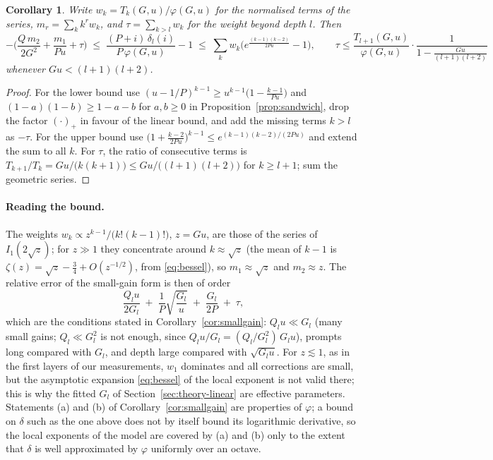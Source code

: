 \documentclass[11pt]{article}
\newtheorem{corollary}{Corollary}
\theoremstyle{definition}
\theoremstyle{remark}
\begin{document}
\begin{corollary}\label{cor:smallgain-quant}
Write $w_k=T_k(G,u)/\varphi(G,u)$ for the normalised terms of the series, $m_r=\sum_kk^rw_k$, and $\tau=\sum_{k>l}w_k$ for the weight beyond depth $l$. Then
\[
-\Big(\frac{Q\,m_2}{2G^2}+\frac{m_1}{Pu}+\tau\Big)\;\le\;\frac{(P+i)\,\delta_l(i)}{P\,\varphi(G,u)}-1\;\le\;\sum_kw_k\Big(e^{\frac{(k-1)(k-2)}{2Pu}}-1\Big),
\qquad
\tau\le\frac{T_{l+1}(G,u)}{\varphi(G,u)}\cdot\frac{1}{1-\frac{Gu}{(l+1)(l+2)}}
\]
whenever $Gu<(l+1)(l+2)$.
\end{corollary}
\begin{proof}
For the lower bound use $(u-1/P)^{k-1}\ge u^{k-1}\big(1-\frac{k-1}{Pu}\big)$ and $(1-a)(1-b)\ge1-a-b$ for $a,b\ge0$ in Proposition~\ref{prop:sandwich}, drop the factor $(\cdot)_+$ in favour of the linear bound, and add the missing terms $k>l$ as $-\tau$. For the upper bound use $\big(1+\frac{k-2}{2Pu}\big)^{k-1}\le e^{(k-1)(k-2)/(2Pu)}$ and extend the sum to all $k$. For $\tau$, the ratio of consecutive terms is $T_{k+1}/T_k=Gu/\big(k(k+1)\big)\le Gu/\big((l+1)(l+2)\big)$ for $k\ge l+1$; sum the geometric series.
\end{proof}

\paragraph{Reading the bound.} The weights $w_k\propto z^{k-1}/\big(k!(k-1)!\big)$, $z=Gu$, are those of the series of $I_1(2\sqrt z)$; for $z\gg1$ they concentrate around $k\approx\sqrt z$ (the mean of $k-1$ is $\zeta(z)=\sqrt z-\frac34+O(z^{-1/2})$, from \eqref{eq:bessel}), so $m_1\approx\sqrt z$ and $m_2\approx z$. The relative error of the small-gain form is then of order
\[
\frac{Q_lu}{2G_l}\;+\;\frac1P\sqrt{\frac{G_l}{u}}\;+\;\frac{G_l}{2P}\;+\;\tau ,
\]
which are the conditions stated in Corollary~\ref{cor:smallgain}: $Q_lu\ll G_l$ (many small gains; $Q_l\ll G_l^2$ is not enough, since $Q_lu/G_l=(Q_l/G_l^2)\,G_lu$), prompts long compared with $G_l$, and depth large compared with $\sqrt{G_lu}$. For $z\lesssim1$, as in the first layers of our measurements, $w_1$ dominates and all corrections are small, but the asymptotic expansion \eqref{eq:bessel} of the local exponent is not valid there; this is why the fitted $G_l$ of Section~\ref{sec:theory-linear} are effective parameters. Statements (a) and (b) of Corollary~\ref{cor:smallgain} are properties of $\varphi$; a bound on $\delta$ such as the one above does not by itself bound its logarithmic derivative, so the local exponents of the model are covered by (a) and (b) only to the extent that $\delta$ is well approximated by $\varphi$ uniformly over an octave.
\end{document}
